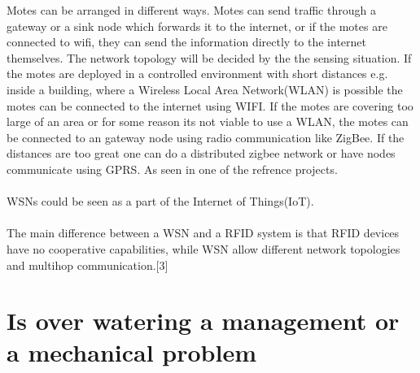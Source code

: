 \documentclass[]{uiophd}
\begin{document}
Motes can be arranged in different ways. Motes can send traffic through a gateway or a sink node which forwards it to the internet, or if the motes are connected to wifi, they can send the information directly to the internet themselves. The network topology will be decided by the the sensing situation. If the motes are deployed in a controlled environment with short distances e.g. inside a building, where a Wireless Local Area Network(WLAN) is possible the motes can be connected to the internet using WIFI. If the motes are covering too large of an area or for some reason its not viable to use a WLAN, the motes can be connected to an gateway node using radio communication like ZigBee. If the distances are too great one can do a distributed zigbee network or have nodes communicate using GPRS. As seen in one of the refrence projects.
\\\\
WSNs could be seen as a part of the Internet of Things(IoT).
\\\\
The main difference between a WSN and a RFID system is that RFID devices have no cooperative capabilities, while WSN allow different network topologies and multihop communication.[3]


\section{Is over watering a management or a mechanical problem}
\end{document}
